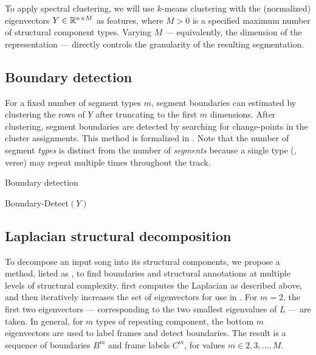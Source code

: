 \documentclass{article}
\begin{document}
To apply spectral clustering, we will use $k$-means clustering with the (normalized) 
eigenvectors $Y \in \mathbb{R}^{n \times M}$ as features, where $M > 0$ is a 
specified maximum number of structural component types.  Varying $M$ --- equivalently, 
the dimension of the representation --- directly controls the granularity of 
the resulting segmentation.


\subsection{Boundary detection}
For a fixed number of segment types $m$, segment boundaries can estimated 
by clustering the rows of $Y$ after truncating to the first $m$ dimensions.
After clustering, segment boundaries are detected by searching for change-points in
the cluster assignments.  This method is formalized in .
Note that the number of segment \emph{types} is distinct from the number of \emph{segments} because a single 
type (\eg, verse) may repeat multiple times throughout the track.

\begin{algorithm}[t]
\caption{Boundary detection\label{bd}}
\begin{algorithmic}[1]
\item[]
\item[]
{\sc Boundary-Detect}$(Y)$
\end{algorithmic}
\end{algorithm}


\subsection{Laplacian structural decomposition}

To decompose an input song into its structural components, we propose a method, listed
as ,
to find boundaries and structural annotations at multiple levels of structural
complexity.   first computes the Laplacian as described above, and
then iteratively increases the set of eigenvectors for use in .  For $m=2$,
the first two eigenvectors --- corresponding to the two smallest eigenvalues of $L$
--- are taken.  In general, for $m$ types of repeating component, the bottom $m$
eigenvectors are used to label frames and detect boundaries.  The result is a sequence
of boundaries $B^m$ and frame labels $C^m$, for values $m \in 2, 3, \dots, M$.
\end{document}
